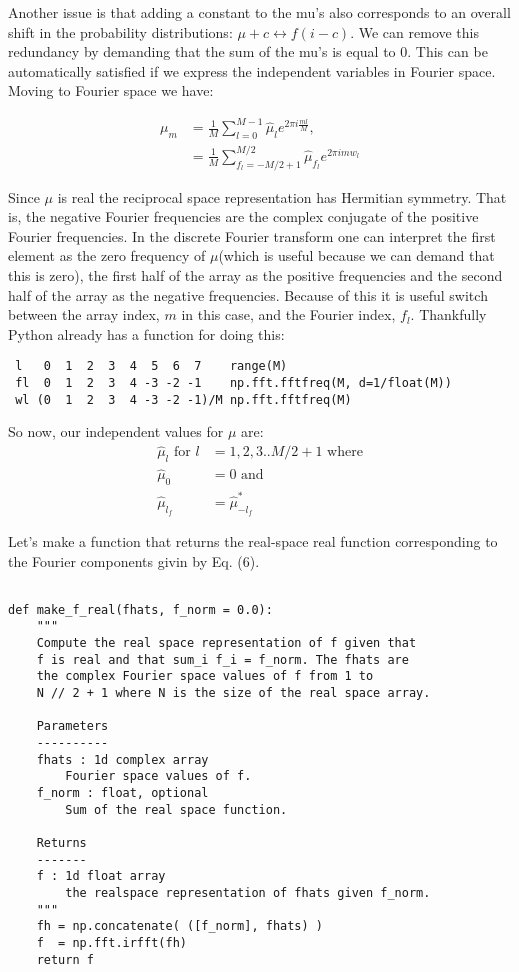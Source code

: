 \documentclass[11pt]{article}
\begin{document}
Another issue is that adding a constant to the mu's also corresponds to an overall shift in the probability distributions: $\mu + c \longleftrightarrow  f(i - c)$. We can remove this redundancy by demanding that the sum of the mu's is equal to 0. This can be automatically satisfied if we express the independent variables in Fourier space. Moving to Fourier space we have:

\begin{align} 
   \mu_m &= \frac{1}{M} \sum_{l=0}^{M-1} \hat{\mu}_l e^{2\pi i \frac{m l}{M}}, \\
   &= \frac{1}{M} \sum_{f_l=-M/2 + 1}^{M/2} \hat{\mu}_{f_l} e^{2\pi i mw_l} 
\end{align}

Since $\mu$ is real the reciprocal space representation has Hermitian symmetry. That is, the negative Fourier frequencies are the complex conjugate of the positive Fourier frequencies. In the discrete Fourier transform one can interpret the first element as the zero frequency of $\mu$(which is useful because we can demand that this is zero), the first half of the array as the positive frequencies and the second half of the array as the negative frequencies. Because of this it is useful switch between the array index, $m$ in this case, and the Fourier index, $f_l$. Thankfully Python already has a function for doing this:

\begin{verbatim}
 l   0  1  2  3  4  5  6  7    range(M)
 fl  0  1  2  3  4 -3 -2 -1    np.fft.fftfreq(M, d=1/float(M))
 wl (0  1  2  3  4 -3 -2 -1)/M np.fft.fftfreq(M)
\end{verbatim}

So now, our independent values for $\mu$ are:
\begin{align}
   \hat{\mu}_l \text{  for } l &= 1, 2, 3 .. M/2 + 1 \text{  where}\\
   \hat{\mu}_0 &= 0 \text{  and} \\
   \hat{\mu}_{l_f} &= \hat{\mu}^*_{-l_f}
\end{align}

\newpage
Let's make a function that returns the real-space real function corresponding to the Fourier components givin by Eq. (6).
\begin{verbatim}

def make_f_real(fhats, f_norm = 0.0):
    """
    Compute the real space representation of f given that 
    f is real and that sum_i f_i = f_norm. The fhats are 
    the complex Fourier space values of f from 1 to 
    N // 2 + 1 where N is the size of the real space array.
    
    Parameters
    ----------
    fhats : 1d complex array
        Fourier space values of f.
    f_norm : float, optional
        Sum of the real space function.
              
    Returns
    -------
    f : 1d float array
        the realspace representation of fhats given f_norm.
    """
    fh = np.concatenate( ([f_norm], fhats) )
    f  = np.fft.irfft(fh)
    return f
    
\end{verbatim}
\end{document}
